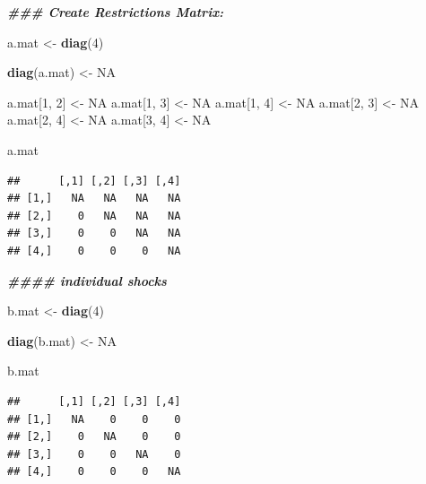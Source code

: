 \documentclass[
]{book}
\newenvironment{Shaded}{\begin{snugshade}}{\end{snugshade}}
\newcommand{\ConstantTok}[1]{\textcolor[rgb]{0.56,0.35,0.01}{#1}}
\newcommand{\DecValTok}[1]{\textcolor[rgb]{0.00,0.00,0.81}{#1}}
\newcommand{\DocumentationTok}[1]{\textcolor[rgb]{0.56,0.35,0.01}{\textbf{\textit{#1}}}}
\newcommand{\FunctionTok}[1]{\textcolor[rgb]{0.13,0.29,0.53}{\textbf{#1}}}
\newcommand{\NormalTok}[1]{#1}
\newcommand{\OtherTok}[1]{\textcolor[rgb]{0.56,0.35,0.01}{#1}}
\begin{document}
\begin{Shaded}
\begin{Highlighting}[]
\DocumentationTok{\#\#\# Create Restrictions Matrix:}

\NormalTok{a.mat }\OtherTok{\textless{}{-}} \FunctionTok{diag}\NormalTok{(}\DecValTok{4}\NormalTok{)}

\FunctionTok{diag}\NormalTok{(a.mat) }\OtherTok{\textless{}{-}} \ConstantTok{NA}

\NormalTok{a.mat[}\DecValTok{1}\NormalTok{, }\DecValTok{2}\NormalTok{] }\OtherTok{\textless{}{-}} \ConstantTok{NA}
\NormalTok{a.mat[}\DecValTok{1}\NormalTok{, }\DecValTok{3}\NormalTok{] }\OtherTok{\textless{}{-}} \ConstantTok{NA}
\NormalTok{a.mat[}\DecValTok{1}\NormalTok{, }\DecValTok{4}\NormalTok{] }\OtherTok{\textless{}{-}} \ConstantTok{NA}
\NormalTok{a.mat[}\DecValTok{2}\NormalTok{, }\DecValTok{3}\NormalTok{] }\OtherTok{\textless{}{-}} \ConstantTok{NA}
\NormalTok{a.mat[}\DecValTok{2}\NormalTok{, }\DecValTok{4}\NormalTok{] }\OtherTok{\textless{}{-}} \ConstantTok{NA}
\NormalTok{a.mat[}\DecValTok{3}\NormalTok{, }\DecValTok{4}\NormalTok{] }\OtherTok{\textless{}{-}} \ConstantTok{NA}

\NormalTok{a.mat}
\end{Highlighting}
\end{Shaded}

\begin{verbatim}
##      [,1] [,2] [,3] [,4]
## [1,]   NA   NA   NA   NA
## [2,]    0   NA   NA   NA
## [3,]    0    0   NA   NA
## [4,]    0    0    0   NA
\end{verbatim}

\begin{Shaded}
\begin{Highlighting}[]
\DocumentationTok{\#\#\#\# individual shocks}

\NormalTok{b.mat }\OtherTok{\textless{}{-}} \FunctionTok{diag}\NormalTok{(}\DecValTok{4}\NormalTok{)}

\FunctionTok{diag}\NormalTok{(b.mat) }\OtherTok{\textless{}{-}} \ConstantTok{NA}

\NormalTok{b.mat}
\end{Highlighting}
\end{Shaded}

\begin{verbatim}
##      [,1] [,2] [,3] [,4]
## [1,]   NA    0    0    0
## [2,]    0   NA    0    0
## [3,]    0    0   NA    0
## [4,]    0    0    0   NA
\end{verbatim}
\end{document}
